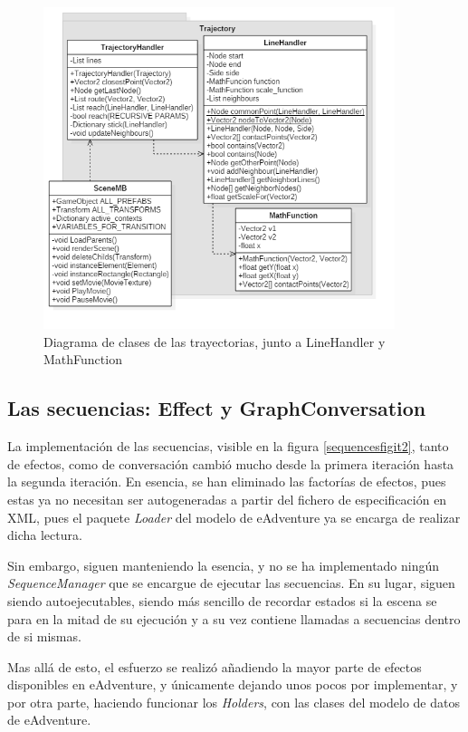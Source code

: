 \begin{figure}[h!]
	\centerline{\includegraphics[height=3.7in]{figures/it2/TrajectoryHandler.png}}
	\caption[TrajectoryHandler - Versión Final]{Diagrama de clases de las trayectorias, junto a LineHandler y MathFunction}
	\label{trajectoryfigit2}
\end{figure}

\subsection{Las secuencias: Effect y GraphConversation}
\label{sequencesit2}

La implementación de las secuencias, visible en la figura \ref{sequencesfigit2}, tanto de efectos, como de conversación cambió mucho desde la primera iteración hasta la segunda iteración. En esencia, se han eliminado las factorías de efectos, pues estas ya no necesitan ser autogeneradas a partir del fichero de especificación en XML, pues el paquete \textit{Loader} del modelo de eAdventure ya se encarga de realizar dicha lectura.

Sin embargo, siguen manteniendo la esencia, y no se ha implementado ningún \textit{SequenceManager} que se encargue de ejecutar las secuencias. En su lugar, siguen siendo autoejecutables, siendo más sencillo de recordar estados si la escena se para en la mitad de su ejecución y a su vez contiene llamadas a secuencias dentro de si mismas.

Mas allá de esto, el esfuerzo se realizó añadiendo la mayor parte de efectos disponibles en eAdventure, y únicamente dejando unos pocos por implementar, y por otra parte, haciendo funcionar los \textit{Holders}, con las clases del modelo de datos de eAdventure.


